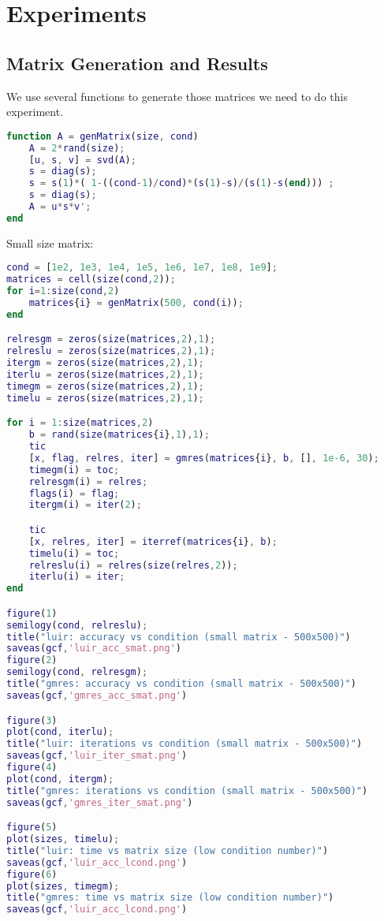 \section{Experiments}

\subsection{Matrix Generation and Results}
We use several functions to generate those matrices we need to do this experiment.
\begin{lstlisting}[language=Matlab, caption=generating matrix]
function A = genMatrix(size, cond)
    A = 2*rand(size);
    [u, s, v] = svd(A);
    s = diag(s);
    s = s(1)*( 1-((cond-1)/cond)*(s(1)-s)/(s(1)-s(end))) ;
    s = diag(s);
    A = u*s*v';
end
\end{lstlisting}
Small size matrix:
\begin{lstlisting}[language=Matlab, caption=Small size mtrix]
    cond = [1e2, 1e3, 1e4, 1e5, 1e6, 1e7, 1e8, 1e9];
matrices = cell(size(cond,2));
for i=1:size(cond,2)
    matrices{i} = genMatrix(500, cond(i));
end

relresgm = zeros(size(matrices,2),1);
relreslu = zeros(size(matrices,2),1);
itergm = zeros(size(matrices,2),1);
iterlu = zeros(size(matrices,2),1);
timegm = zeros(size(matrices,2),1);
timelu = zeros(size(matrices,2),1);

for i = 1:size(matrices,2)
    b = rand(size(matrices{i},1),1);
    tic
    [x, flag, relres, iter] = gmres(matrices{i}, b, [], 1e-6, 30);
    timegm(i) = toc;
    relresgm(i) = relres;
    flags(i) = flag;
    itergm(i) = iter(2);

    tic
    [x, relres, iter] = iterref(matrices{i}, b);
    timelu(i) = toc;
    relreslu(i) = relres(size(relres,2));
    iterlu(i) = iter;
end

figure(1)
semilogy(cond, relreslu);
title("luir: accuracy vs condition (small matrix - 500x500)")
saveas(gcf,'luir_acc_smat.png')
figure(2)
semilogy(cond, relresgm);
title("gmres: accuracy vs condition (small matrix - 500x500)")
saveas(gcf,'gmres_acc_smat.png')

figure(3)
plot(cond, iterlu);
title("luir: iterations vs condition (small matrix - 500x500)")
saveas(gcf,'luir_iter_smat.png')
figure(4)
plot(cond, itergm);
title("gmres: iterations vs condition (small matrix - 500x500)")
saveas(gcf,'gmres_iter_smat.png')

figure(5)
plot(sizes, timelu);
title("luir: time vs matrix size (low condition number)")
saveas(gcf,'luir_acc_lcond.png')
figure(6)
plot(sizes, timegm);
title("gmres: time vs matrix size (low condition number)")
saveas(gcf,'luir_acc_lcond.png')

\end{lstlisting}  
